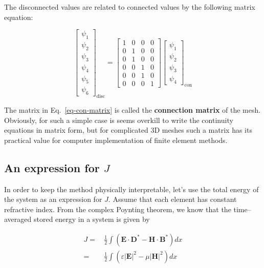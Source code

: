 The disconnected values are related to connected values by the following matrix equation:

\begin{equation}
\begin{bmatrix}
\psi_1 \\ \psi_2 \\ \psi_3 \\ \psi_4 \\ \psi_5 \\ \psi_6
\end{bmatrix}_{\mathrm{disc}}
=
\begin{bmatrix}
1 & 0 & 0 & 0  \\ 
0 & 1 & 0 & 0  \\   
0 & 1 & 0 & 0  \\ 
0 & 0 & 1 & 0  \\   
0 & 0 & 1 & 0  \\  
0 & 0 & 0 & 1  
\end{bmatrix}
\begin{bmatrix}
\psi_1 \\ \psi_2 \\ \psi_3 \\ \psi_4
\end{bmatrix}_{\mathrm{con}}
\label{eq-con-matrix}
\end{equation} 

The matrix in Eq.~\ref{eq-con-matrix} is called the \textbf{connection matrix} of the mesh. Obviously, for such a simple case is seems overkill to write the continuity equations in matrix form, but for complicated 3D meshes such a matrix has its practical value for computer implementation of finite element methods.

\subsection{An expression for $J$}

In order to keep the method physically interpretable, let's use the total energy of the system as an expression for $J$. Assume that each element has constant refractive index. From the complex Poynting theorem, we know that the time--averaged stored energy in a system is given by

\begin{align}
J =& \, \frac{1}{2} \int ( {\mathbf E} \cdot {\mathbf D}^* - {\mathbf H} \cdot {\mathbf B}^* ) dx \\
  =& \, \frac{1}{2} \int ( \varepsilon |{\mathbf E}|^2 - \mu |{\mathbf H}|^2 ) dx
\end{align} 

